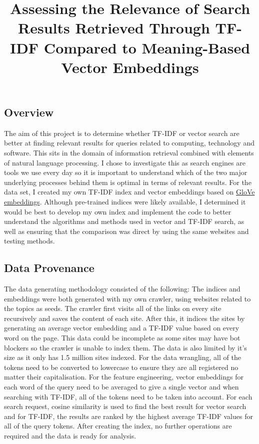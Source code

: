 \documentclass[12pt,a4paper]{article}
\date{\vspace{-5ex}}
\author{}
\title{Assessing the Relevance of Search Results Retrieved Through TF-IDF
Compared to Meaning-Based Vector Embeddings}
\begin{document}
\maketitle

\subsection*{Overview}

The aim of this project is to determine whether TF-IDF or vector search are
better at finding relevant results for queries related to computing, technology
and software. This sits in the domain of information retrieval combined with
elements of natural language processing. I chose to investigate this as search
engines are tools we use every day so it is important to understand which of the
two major underlying processes behind them is optimal in terms of relevant
results. For the data set, I created my own TF-IDF index and vector embeddings
based on \href{https://nlp.stanford.edu/projects/glove/}{GloVe embeddings}.
Although pre-trained indices were likely available, I determined it would be
best to develop my own index and implement the code to better understand the
algorithms and methods used in vector and TF-IDF search, as well as ensuring
that the comparison was direct by using the same websites and testing methods.

\subsection*{Data Provenance}

The data generating methodology consisted of the following: The indices and
embeddings were both generated with my own crawler, using websites related to
the topics as seeds. The crawler first visits all of the links on every site
recursively and saves the content of each site. After this, it indices the sites
by generating an average vector embedding and a TF-IDF value based on every word
on the page. This data could be incomplete as some sites may have bot blockers
so the crawler is unable to index them. The data is also limited by it's size as
it only has 1.5 million sites indexed. For the data wrangling, all of the tokens
need to be converted to lowercase to ensure they are all registered no matter
their capitalisation. For the feature engineering, vector embeddings for each
word of the query need to be averaged to give a single vector and when searching
with TF-IDF, all of the tokens need to be taken into account. For each search
request, cosine similarity is used to find the best result for vector search and
for TF-IDF, the results are ranked by the highest average TF-IDF values for all
of the query tokens. After creating the index, no further operations are
required and the data is ready for analysis.
\end{document}
